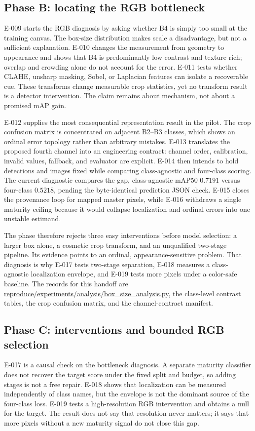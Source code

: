 \documentclass[preprint,12pt]{elsarticle}
\newcommand{\pathcode}[1]{\scriptsize\url{#1}}
\newcommand{\mAP}{mAP}
\begin{document}
\subsection{Phase B: locating the RGB bottleneck}
E-009 starts the RGB diagnosis by asking whether B4 is simply too small at the
training canvas. The box-size distribution makes scale a disadvantage, but
not a sufficient explanation. E-010 changes the measurement from geometry to
appearance and shows that B4 is predominantly low-contrast and texture-rich;
overlap and crowding alone do not account for the error. E-011 tests whether
CLAHE, unsharp masking, Sobel, or Laplacian features can isolate a recoverable
cue. These transforms change measurable crop statistics, yet no transform
result is a detector intervention. The claim remains about mechanism, not
about a promised mAP gain.

E-012 supplies the most consequential representation result in the pilot.
The crop confusion matrix is concentrated on adjacent B2--B3 classes, which
shows an ordinal error topology rather than arbitrary mistakes. E-013 translates
the proposed fourth channel into an engineering contract: channel order,
calibration, invalid values, fallback, and evaluator are explicit. E-014 then
intends to hold detections and images fixed while comparing class-agnostic and
four-class scoring. The current diagnostic compares the gap, class-agnostic
\mAP50 \(0.7191\) versus four-class \(0.5218\), pending the
byte-identical prediction JSON check. E-015 closes the provenance loop for mapped master
pixels, while E-016 withdraws a single maturity ceiling because it would
collapse localization and ordinal errors into one unstable estimand.

The phase therefore rejects three easy interventions before model selection:
a larger box alone, a cosmetic crop transform, and an unqualified two-stage
pipeline. Its evidence points to an ordinal, appearance-sensitive problem.
That diagnosis is why E-017 tests two-stage separation, E-018 measures a
class-agnostic localization envelope, and E-019 tests more pixels under a
color-safe baseline. The records for this handoff are
\pathcode{reproduce/experiments/analysis/box_size_analysis.py}, the class-level contrast tables, the crop
confusion matrix, and the channel-contract manifest.

\subsection{Phase C: interventions and bounded RGB selection}
E-017 is a causal check on the bottleneck diagnosis. A separate maturity
classifier does not recover the target score under the fixed split and
budget, so adding stages is not a free repair. E-018 shows that localization
can be measured independently of class names, but the envelope is not the
dominant source of the four-class loss. E-019 tests a high-resolution RGB
intervention and obtains a null for the target. The result does not say that
resolution never matters; it says that more pixels without a new maturity
signal do not close this gap.
\end{document}

